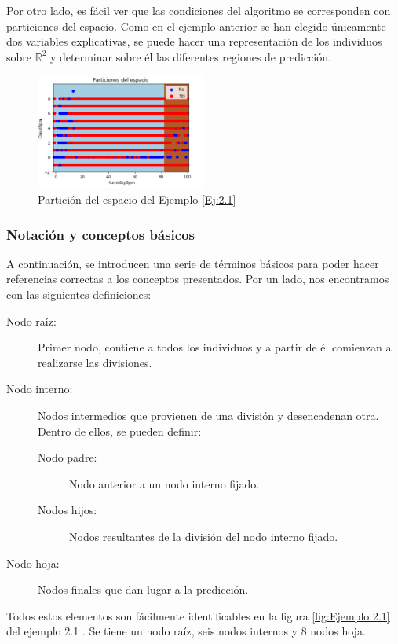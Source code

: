 \documentclass[12pt,twoside]{article}
\begin{document}
Por otro lado, es fácil ver que las condiciones del algoritmo se corresponden con particiones del espacio. Como en el ejemplo anterior se han elegido únicamente dos variables explicativas, se puede hacer una representación de los individuos sobre $\mathbb{R}^{2}$ y determinar sobre él las diferentes regiones de predicción.
\begin{figure}[h]
	\centering
	\includegraphics[width = 0.5\textwidth]{ex2_1_02}
	\caption{Partición del espacio del Ejemplo \ref{Ej:2.1}}
	\label{fig:Ejemplo 2.1.2}
\end{figure}


\subsubsection{Notación y conceptos básicos}

A continuación, se introducen una serie de términos básicos para poder hacer referencias correctas a los conceptos presentados. Por un lado, nos encontramos con las siguientes definiciones:
\begin{description}
\item[Nodo raíz: ]Primer nodo, contiene a todos los individuos y a partir de él comienzan a realizarse las divisiones.
\item[Nodo interno: ]Nodos intermedios que provienen de una división y desencadenan otra. Dentro de ellos, se pueden definir:
	\begin{description}
	\item[Nodo padre: ]Nodo anterior a un nodo interno fijado.
	\item[Nodos hijos: ]Nodos resultantes de la división del nodo interno fijado.
	\end{description}
\item[Nodo hoja: ]Nodos finales que dan lugar a la predicción.
\end{description}

Todos estos elementos son fácilmente identificables en la figura \ref{fig:Ejemplo 2.1} del ejemplo 2.1 . Se tiene un nodo raíz, seis nodos internos y 8 nodos hoja.
\end{document}
